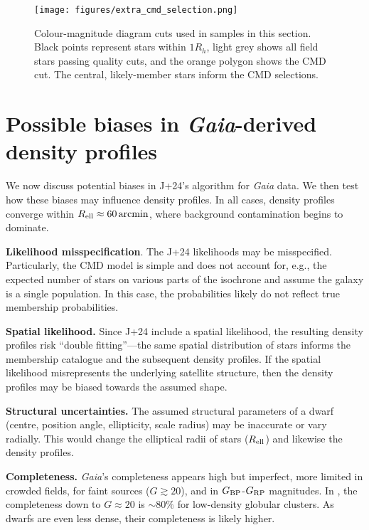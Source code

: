 \begin{figure}
\centering
\texttt{[image: figures/extra\_cmd\_selection.png]}
\caption[Colour-Magnitude sample selection]{Colour-magnitude diagram
cuts used in samples in this section. Black points represent stars
within \(1R_h\), light grey shows all field stars passing quality cuts,
and the orange polygon shows the CMD cut. The central, likely-member
stars inform the CMD selections.}\label{fig:extra_cmd}
\end{figure}

\section{\texorpdfstring{Possible biases in \emph{Gaia}-derived density
profiles}{Possible biases in Gaia-derived density profiles}}\label{sec:density_extra}

We now discuss potential biases in J+24's algorithm for \emph{Gaia}
data. We then test how these biases may influence density profiles. In
all cases, density profiles converge within
\(R_{\rm ell} \approx 60\,{\rm arcmin}\), where background contamination
begins to dominate.

\textbf{Likelihood misspecification}. The J+24 likelihoods may be
misspecified. Particularly, the CMD model is simple and does not account
for, e.g., the expected number of stars on various parts of the
isochrone and assume the galaxy is a single population. In this case,
the probabilities likely do not reflect true membership probabilities.

\textbf{Spatial likelihood.} Since J+24 include a spatial likelihood,
the resulting density profiles risk ``double fitting''---the same
spatial distribution of stars informs the membership catalogue and the
subsequent density profiles. If the spatial likelihood misrepresents the
underlying satellite structure, then the density profiles may be biased
towards the assumed shape.

\textbf{Structural uncertainties.} The assumed structural parameters of
a dwarf (centre, position angle, ellipticity, scale radius) may be
inaccurate or vary radially. This would change the elliptical radii of
stars (\(R_{\rm ell}\)) and likewise the density profiles.

\textbf{Completeness.} \emph{Gaia}'s completeness appears high but
imperfect, more limited in crowded fields, for faint sources
(\(G\gtrsim20\)), and in \(G_{\rm BP}\)-\(G_{\rm RP}\) magnitudes. In
\citet{fabricius+2021}, the completeness down to \(G\approx 20\) is
\(\sim 80\%\) for low-density globular clusters. As dwarfs are even less
dense, their completeness is likely higher.

